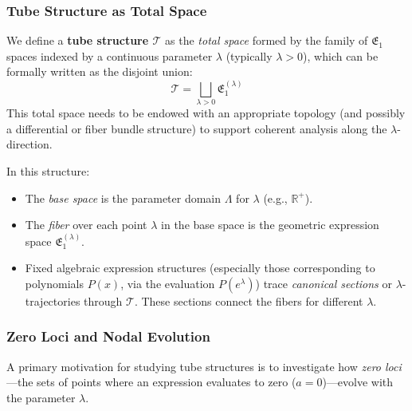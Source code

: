 \subsubsection{Tube Structure as Total Space}\label{subsec:tube_total_space}

We define a \textbf{tube structure $\mathcal{T}$} as the \emph{total space} formed by the family of $\mathfrak{E}_1$ spaces indexed by a continuous parameter $\lambda$ (typically $\lambda > 0$), which can be formally written as the disjoint union:
\begin{equation}
\mathcal{T} = \bigsqcup_{\lambda > 0} \mathfrak{E}_1^{(\lambda)}
\end{equation}
This total space needs to be endowed with an appropriate topology (and possibly a differential or fiber bundle structure) to support coherent analysis along the $\lambda$-direction.

In this structure:
\begin{itemize}
    \item The \emph{base space} is the parameter domain $\Lambda$ for $\lambda$ (e.g., $\mathbb{R}^+$).
    \item The \emph{fiber} over each point $\lambda$ in the base space is the geometric expression space $\mathfrak{E}_1^{(\lambda)}$.
    \item Fixed algebraic expression structures (especially those corresponding to polynomials $P(x)$, via the evaluation $P(e^\lambda)$) trace \emph{canonical sections} or $\lambda$-trajectories through $\mathcal{T}$. These sections connect the fibers for different $\lambda$.
\end{itemize}

\subsubsection{Zero Loci and Nodal Evolution}\label{subsec:tube_zeros}

A primary motivation for studying tube structures is to investigate how \emph{zero loci}—the sets of points where an expression evaluates to zero ($a=0$)—evolve with the parameter $\lambda$.

